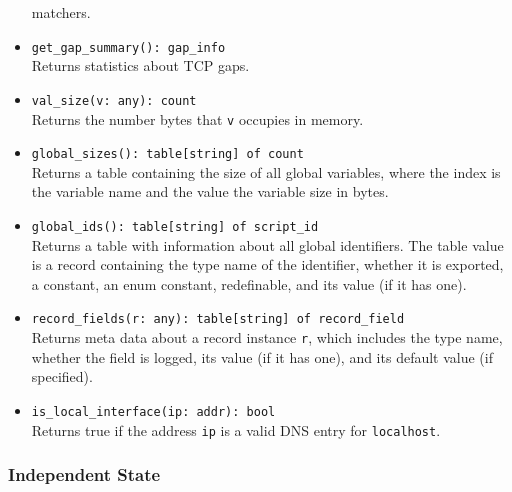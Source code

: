 \documentclass[10pt,landscape]{article}
\begin{document}
\begin{multicols*}{2}
\begin{itemize}
    matchers.
  \item \verb|get_gap_summary(): gap_info|\\
    Returns statistics about TCP gaps.
  \item \verb|val_size(v: any): count|\\
    Returns the number bytes that \verb|v| occupies in memory.
  \item \verb|global_sizes(): table[string] of count|\\
    Returns a table containing the size of all global variables, where the
    index is the variable name and the value the variable size in bytes.
  \item \verb|global_ids(): table[string] of script_id|\\
    Returns a table with information about all global identifiers. The table
    value is a record containing the type name of the identifier, whether it is
    exported, a constant, an enum constant, redefinable, and its value (if it
    has one).
  \item \verb|record_fields(r: any): table[string] of record_field|\\
    Returns meta data about a record instance \verb|r|, which includes the
    type name, whether the field is logged, its value (if it has one), and its
    default value (if specified).
  \item \verb|is_local_interface(ip: addr): bool|\\
    Returns true if the address \verb|ip| is a valid DNS entry for
    \texttt{localhost}.
\end{itemize}

\subsubsection*{Independent State}


\end{multicols*}
\end{document}
